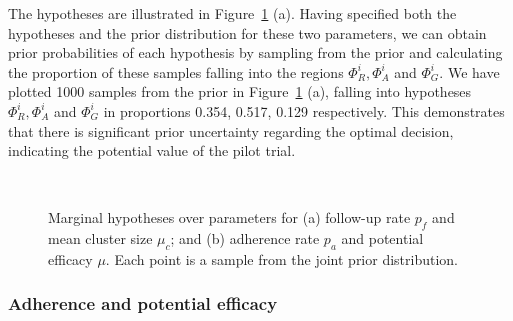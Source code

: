 \documentclass[AMA,STIX1COL]{WileyNJD-v2}
\begin{document}
The hypotheses are illustrated in Figure~\ref{fig:hyps} (a). Having specified both the hypotheses and the prior distribution for these two parameters, we can obtain prior probabilities of each hypothesis by sampling from the prior and calculating the proportion of these samples falling into the regions $\Phi^i_R, \Phi^i_A$ and $\Phi^i_G$. We have plotted 1000 samples from the prior in Figure~\ref{fig:hyps} (a), falling into hypotheses  $\Phi^i_R, \Phi^i_A$ and $\Phi^i_G$ in proportions 0.354, 0.517, 0.129 respectively. This demonstrates that there is significant prior uncertainty regarding the optimal decision, indicating the potential value of the pilot trial.

\begin{figure}
   \centering
   \quad
   \\
   \caption{Marginal hypotheses over parameters for (a) follow-up rate $p_{f}$ and mean cluster size $\mu_{c}$; and (b) adherence rate $p_{a}$ and potential efficacy $\mu$. Each point is a sample from the joint prior distribution.}
   \label{fig:hyps}
\end{figure}

\subsubsection{Adherence and potential efficacy}
\end{document}
